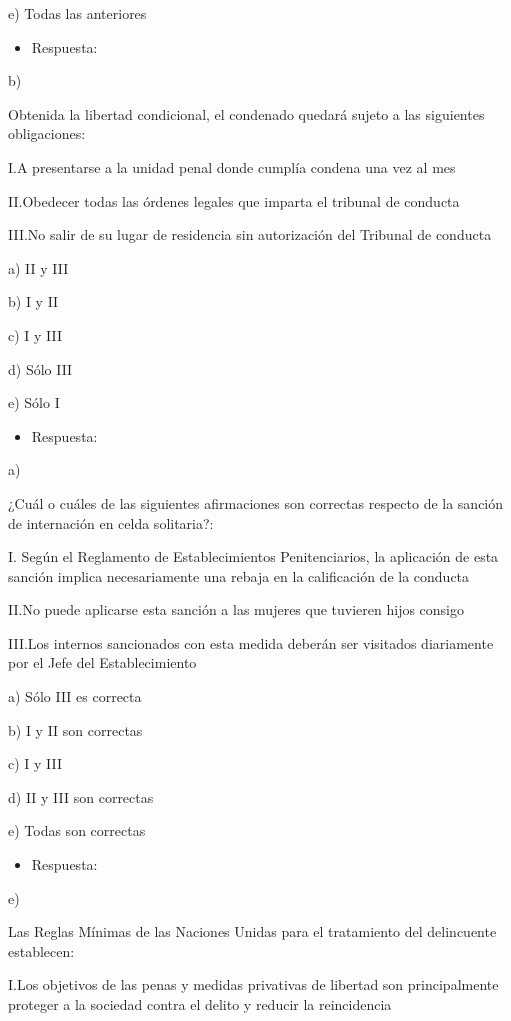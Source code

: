 \documentclass[letterpaper, 11pt]{article}
\begin{document}
e) Todas las anteriores

\begin{itemize}
\item Respuesta:
\end{itemize}
b)

Obtenida la libertad condicional, el condenado quedará sujeto a las siguientes
obligaciones:

I.A presentarse a la unidad penal donde cumplía condena una vez al mes

II.Obedecer todas las órdenes legales que imparta el tribunal de conducta

III.No salir de su lugar de residencia sin autorización del Tribunal de conducta

a) II y III

b) I y II

c) I y III

d) Sólo III

e) Sólo I

\begin{itemize}
\item Respuesta:
\end{itemize}
a)


¿Cuál o cuáles de las siguientes afirmaciones son correctas respecto de la
sanción de internación en celda solitaria?:

I. Según el Reglamento de Establecimientos Penitenciarios, la aplicación de esta
sanción implica necesariamente una rebaja en la calificación de la conducta

II.No puede aplicarse esta sanción a las mujeres que tuvieren hijos consigo

III.Los internos sancionados con esta medida deberán ser visitados diariamente por el
Jefe del Establecimiento

a) Sólo III es correcta

b) I y II son correctas

c) I y III

d) II y III son correctas

e) Todas son correctas

\begin{itemize}
\item Respuesta:
\end{itemize}
e)


Las Reglas Mínimas de las Naciones Unidas para el tratamiento del delincuente
establecen:

I.Los objetivos de las penas y medidas privativas de libertad son principalmente
proteger a la sociedad contra el delito y reducir la reincidencia
\end{document}
